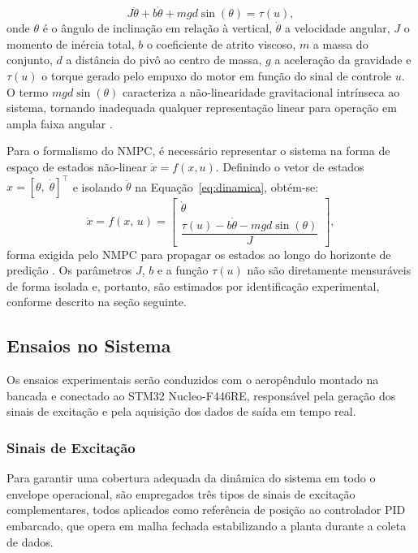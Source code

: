 \begin{equation}
    J\ddot{\theta} + b\dot{\theta} + mgd\sin(\theta) = \tau(u),
    \label{eq:dinamica}
\end{equation}
\noindent onde $\theta$ é o ângulo de inclinação em relação à vertical, $\dot{\theta}$ a velocidade angular, $J$ o momento de inércia total, $b$ o coeficiente de atrito viscoso, $m$ a massa do conjunto, $d$ a distância do pivô ao centro de massa, $g$ a aceleração da gravidade e $\tau(u)$ o torque gerado pelo empuxo do motor em função do sinal de controle $u$. O termo $mgd\sin(\theta)$ caracteriza a não-linearidade gravitacional intrínseca ao sistema, tornando inadequada qualquer representação linear para operação em ampla faixa angular \cite{khalil2002}.

Para o formalismo do NMPC, é necessário representar o sistema na forma de espaço de estados não-linear $\dot{x} = f(x, u)$. Definindo o vetor de estados $x = [\theta,\;\dot{\theta}]^\top$ e isolando $\ddot{\theta}$ na Equação~\ref{eq:dinamica}, obtém-se:
\begin{equation}
    \dot{x} = f(x,\, u) =
    \begin{bmatrix}
        \dot{\theta} \\[4pt]
        \dfrac{\tau(u) - b\dot{\theta} - mgd\sin(\theta)}{J}
    \end{bmatrix},
    \label{eq:estadonl}
\end{equation}
\noindent forma exigida pelo NMPC para propagar os estados ao longo do horizonte de predição \cite{mayne2000}. Os parâmetros $J$, $b$ e a função $\tau(u)$ não são diretamente mensuráveis de forma isolada e, portanto, são estimados por identificação experimental, conforme descrito na seção seguinte.

\subsection{Ensaios no Sistema}

Os ensaios experimentais serão conduzidos com o aeropêndulo montado na bancada e conectado ao STM32 Nucleo-F446RE, responsável pela geração dos sinais de excitação e pela aquisição dos dados de saída em tempo real.

\subsubsection{Sinais de Excitação}

Para garantir uma cobertura adequada da dinâmica do sistema em todo o envelope operacional, são empregados três tipos de sinais de excitação complementares, todos aplicados como referência de posição ao controlador PID embarcado, que opera em malha fechada estabilizando a planta durante a coleta de dados.

